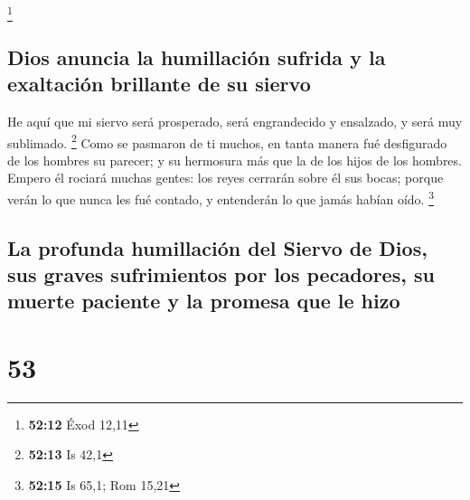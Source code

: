 \footnote{\textbf{52:12} Éxod 12,11}

\hypertarget{dios-anuncia-la-humillaciuxf3n-sufrida-y-la-exaltaciuxf3n-brillante-de-su-siervo}{%
\subsection{Dios anuncia la humillación sufrida y la exaltación
brillante de su
siervo}\label{dios-anuncia-la-humillaciuxf3n-sufrida-y-la-exaltaciuxf3n-brillante-de-su-siervo}}

 He aquí que mi siervo será prosperado, será engrandecido
y ensalzado, y será muy sublimado. \footnote{\textbf{52:13} Is 42,1}
 Como se pasmaron de ti muchos, en tanta manera fué
desfigurado de los hombres su parecer; y su hermosura más que la de los
hijos de los hombres.  Empero él rociará muchas gentes:
los reyes cerrarán sobre él sus bocas; porque verán lo que nunca les fué
contado, y entenderán lo que jamás habían oído. \footnote{\textbf{52:15}
  Is 65,1; Rom 15,21}

\hypertarget{la-profunda-humillaciuxf3n-del-siervo-de-dios-sus-graves-sufrimientos-por-los-pecadores-su-muerte-paciente-y-la-promesa-que-le-hizo}{%
\subsection{La profunda humillación del Siervo de Dios, sus graves
sufrimientos por los pecadores, su muerte paciente y la promesa que le
hizo}\label{la-profunda-humillaciuxf3n-del-siervo-de-dios-sus-graves-sufrimientos-por-los-pecadores-su-muerte-paciente-y-la-promesa-que-le-hizo}}

\hypertarget{section-52}{%
\section{53}\label{section-52}}

